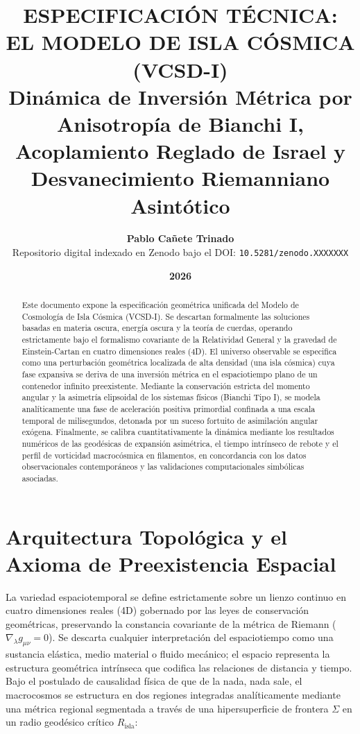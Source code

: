 \documentclass[11pt,a4paper]{article}
\title{\textbf{ESPECIFICACIÓN TÉCNICA: EL MODELO DE ISLA CÓSMICA (VCSD-I)} \\ \large Dinámica de Inversión Métrica por Anisotropía de Bianchi I, Acoplamiento Reglado de Israel y Desvanecimiento Riemanniano Asintótico}
\author{\textbf{Pablo Cañete Trinado} \\ \small Repositorio digital indexado en Zenodo bajo el DOI: \texttt{10.5281/zenodo.XXXXXXX}}
\date{\textbf{2026}}
\begin{document}
\maketitle

\begin{abstract}
Este documento expone la especificación geométrica unificada del Modelo de Cosmología de Isla Cósmica (VCSD-I). Se descartan formalmente las soluciones basadas en materia oscura, energía oscura y la teoría de cuerdas, operando estrictamente bajo el formalismo covariante de la Relatividad General y la gravedad de Einstein-Cartan en cuatro dimensiones reales (4D). El universo observable se especifica como una perturbación geométrica localizada de alta densidad (una isla cósmica) cuya fase expansiva se deriva de una inversión métrica en el espaciotiempo plano de un contenedor infinito preexistente. Mediante la conservación estricta del momento angular y la asimetría elipsoidal de los sistemas físicos (Bianchi Tipo I), se modela analíticamente una fase de aceleración positiva primordial confinada a una escala temporal de milisegundos, detonada por un suceso fortuito de asimilación angular exógena. Finalmente, se calibra cuantitativamente la dinámica mediante los resultados numéricos de las geodésicas de expansión asimétrica, el tiempo intrínseco de rebote y el perfil de vorticidad macrocósmica en filamentos, en concordancia con los datos observacionales contemporáneos y las validaciones computacionales simbólicas asociadas.
\end{abstract}

\section{Arquitectura Topológica y el Axioma de Preexistencia Espacial}
La variedad espaciotemporal se define estrictamente sobre un lienzo continuo en cuatro dimensiones reales (4D) gobernado por las leyes de conservación geométricas, preservando la constancia covariante de la métrica de Riemann ($\nabla_{\lambda} g_{\mu\nu} = 0$). Se descarta cualquier interpretación del espaciotiempo como una sustancia elástica, medio material o fluido mecánico; el espacio representa la estructura geométrica intrínseca que codifica las relaciones de distancia y tiempo. Bajo el postulado de causalidad física de que de la nada, nada sale, el macrocosmos se estructura en dos regiones integradas analíticamente mediante una métrica regional segmentada a través de una hipersuperficie de frontera $\Sigma$ en un radio geodésico crítico $R_{\text{isla}}$:
\end{document}
